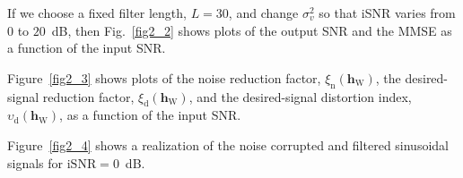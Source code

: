 \documentclass[10pt,pdflatex,headrule,landscape]{beamer}
\begin{document}
\begin{frame}[allowframebreaks]

If we choose a fixed filter length, $L=30$, and change $\sigma_v^2$ so that iSNR varies from $0$ to $20$~dB, then Fig.~\ref{fig2_2} shows plots of the output SNR and the MMSE as a function of the input SNR.


\end{frame}
\begin{frame}[allowframebreaks]

Figure~\ref{fig2_3} shows plots of the noise reduction factor, $\xi_{\mathrm{n}}\left( \mathbf{h}_{\mathrm{W}} \right)$, the desired-signal reduction factor, $\xi_{\mathrm{d}}\left( \mathbf{h}_{\mathrm{W}} \right)$, and the desired-signal distortion index, $\upsilon_{\mathrm{d}}\left( \mathbf{h}_{\mathrm{W}} \right)$, as a function of the input SNR.


\end{frame}
\begin{frame}[allowframebreaks]

Figure~\ref{fig2_4} shows a realization of the noise corrupted and filtered sinusoidal signals for $\mathrm{iSNR}=0$~dB.


\end{frame}
\end{document}
